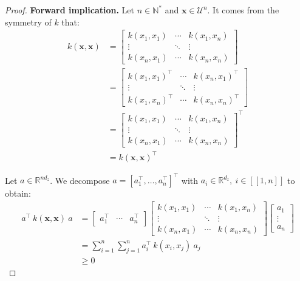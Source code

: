 \begin{proof}
	\textbf{Forward implication.} Let $n\in\mathbb{N}^*$ and $\mathbf{x}\in\mathcal{U}^n$. It comes from the symmetry of $k$ that:
	\begin{equation}
		\begin{aligned}
		k(\mathbf{x},\mathbf{x})&=\begin{bmatrix}
		k(x_1,x_1)&\cdots&k(x_1,x_n)\\\vdots&\ddots&\vdots\\k(x_n,x_1)&\cdots&k(x_n,x_n)
		\end{bmatrix}\\
		&=\begin{bmatrix}
		k(x_1,x_1)^\top&\cdots&k(x_n,x_1)^\top\\\vdots&\ddots&\vdots\\k(x_1,x_n)^\top&\cdots&k(x_n,x_n)^\top
		\end{bmatrix}\\
		&=\begin{bmatrix}
		k(x_1,x_1)&\cdots&k(x_1,x_n)\\\vdots&\ddots&\vdots\\k(x_n,x_1)&\cdots&k(x_n,x_n)
		\end{bmatrix}^\top\\
		&=k(\mathbf{x},\mathbf{x})^\top
		\end{aligned}
	\end{equation}

	Let $a\in\mathbb{R}^{nd_z}$. We decompose $a=[a_1^\top,\dots,a_n^\top]^\top$ with $a_i\in\mathbb{R}^{d_z},\:i\in[\![1,n]\!]$ to obtain:
	\begin{equation}
		\begin{aligned}
		a^\top\:k(\mathbf{x},\mathbf{x})\:a&=\begin{bmatrix}a_1^\top&\cdots&a_n^\top\end{bmatrix}\begin{bmatrix}k(x_1,x_1)&\cdots&k(x_1,x_n)\\\vdots&\ddots&\vdots\\k(x_n,x_1)&\cdots&k(x_n,x_n)\end{bmatrix}\begin{bmatrix}a_1\\\vdots\\a_n\end{bmatrix}\\
		&=\sum_{i=1}^n\sum_{j=1}^na_i^\top\:k(x_i,x_j)\:a_j\\
		&\geq0
		\end{aligned}
	\end{equation}


\end{proof}
